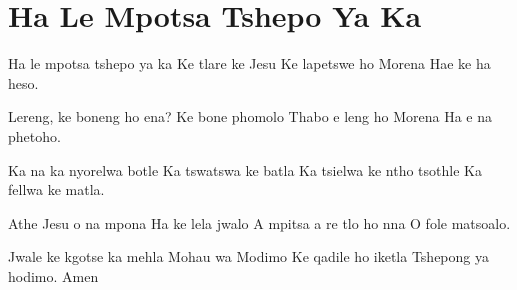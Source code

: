 \starttocol
\chapter{Ha Le Mpotsa Tshepo Ya Ka}
\nexttocol
\hfill{\it }
\stoptocol
\starttocol
\startlines
{\sc Ha} le mpotsa tshepo ya ka
Ke tlare ke Jesu
Ke lapetswe ho Morena
Hae ke ha heso.

Lereng, ke boneng ho ena?
Ke bone phomolo
Thabo e leng ho Morena
Ha e na phetoho.

Ka na ka nyorelwa botle
Ka tswatswa ke batla
Ka tsielwa ke ntho tsothle
Ka fellwa ke matla.

Athe Jesu o na  mpona
Ha ke lela jwalo
A mpitsa a re tlo ho nna
O fole matsoalo.

Jwale ke kgotse ka mehla
Mohau wa Modimo
Ke qadile ho iketla
Tshepong ya hodimo.
\hfill Amen
\stoplines
\nexttocol

\stoptocol
